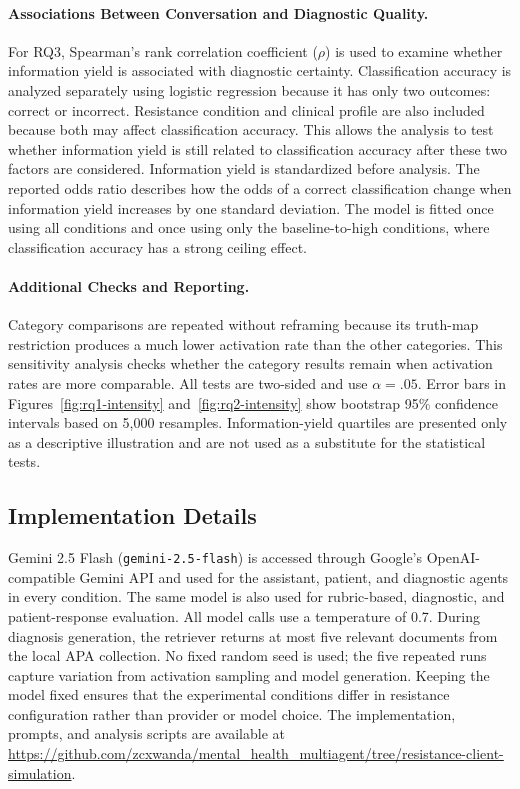 \paragraph{Associations Between Conversation and Diagnostic Quality.}
For RQ3, Spearman's rank correlation coefficient ($\rho$) is used to examine whether information yield is associated with diagnostic certainty. Classification accuracy is analyzed separately using logistic regression because it has only two outcomes: correct or incorrect. Resistance condition and clinical profile are also included because both may affect classification accuracy. This allows the analysis to test whether information yield is still related to classification accuracy after these two factors are considered. Information yield is standardized before analysis. The reported odds ratio describes how the odds of a correct classification change when information yield increases by one standard deviation. The model is fitted once using all conditions and once using only the baseline-to-high conditions, where classification accuracy has a strong ceiling effect.

\paragraph{Additional Checks and Reporting.}
Category comparisons are repeated without reframing because its truth-map restriction produces a much lower activation rate than the other categories. This sensitivity analysis checks whether the category results remain when activation rates are more comparable. All tests are two-sided and use $\alpha=.05$. Error bars in Figures~\ref{fig:rq1-intensity} and~\ref{fig:rq2-intensity} show bootstrap 95\% confidence intervals based on 5,000 resamples. Information-yield quartiles are presented only as a descriptive illustration and are not used as a substitute for the statistical tests.

\subsection{Implementation Details}

Gemini 2.5 Flash (\texttt{gemini-2.5-flash}) is accessed through Google's OpenAI-compatible Gemini API and used for the assistant, patient, and diagnostic agents in every condition. The same model is also used for rubric-based, diagnostic, and patient-response evaluation. All model calls use a temperature of 0.7. During diagnosis generation, the retriever returns at most five relevant documents from the local APA collection. No fixed random seed is used; the five repeated runs capture variation from activation sampling and model generation. Keeping the model fixed ensures that the experimental conditions differ in resistance configuration rather than provider or model choice. The implementation, prompts, and analysis scripts are available at \url{https://github.com/zcxwanda/mental_health_multiagent/tree/resistance-client-simulation}.
